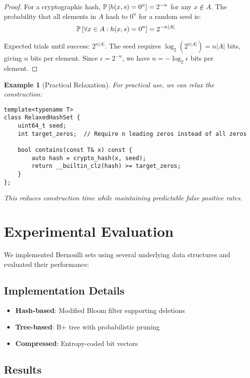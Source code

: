 \documentclass[11pt,final,hidelinks]{article}
\newtheorem{example}[theorem]{Example}
\begin{document}
\begin{proof}
For a cryptographic hash, $\mathbb{P}\left[h(x,s) = 0^n\right] = 2^{-n}$ for any $x \notin A$. The probability that all elements in $A$ hash to $0^n$ for a random seed is:
\begin{equation}
\mathbb{P}\left[\forall x \in A: h(x,s) = 0^n\right] = 2^{-n|A|}
\end{equation}

Expected trials until success: $2^{n|A|}$. The seed requires $\log_2(2^{n|A|}) = n|A|$ bits, giving $n$ bits per element. Since $\epsilon = 2^{-n}$, we have $n = -\log_2 \epsilon$ bits per element.
\end{proof}

\begin{example}[Practical Relaxation]
For practical use, we can relax the construction:
\begin{verbatim}
template<typename T>
class RelaxedHashSet {
    uint64_t seed;
    int target_zeros;  // Require n leading zeros instead of all zeros
    
    bool contains(const T& x) const {
        auto hash = crypto_hash(x, seed);
        return __builtin_clz(hash) >= target_zeros;
    }
};
\end{verbatim}
This reduces construction time while maintaining predictable false positive rates.
\end{example}

\section{Experimental Evaluation}

We implemented Bernoulli sets using several underlying data structures and evaluated their performance:

\subsection{Implementation Details}

\begin{itemize}
    \item \textbf{Hash-based}: Modified Bloom filter supporting deletions
    \item \textbf{Tree-based}: B+ tree with probabilistic pruning
    \item \textbf{Compressed}: Entropy-coded bit vectors
\end{itemize}

\subsection{Results}
\end{document}
